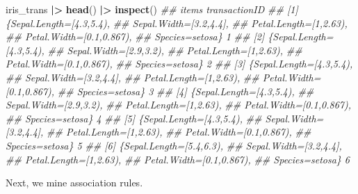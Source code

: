 \documentclass[
  notitlepage]{book}
\newenvironment{Shaded}{\begin{snugshade}}{\end{snugshade}}
\newcommand{\CommentTok}[1]{\textcolor[rgb]{0.56,0.35,0.01}{\textit{#1}}}
\newcommand{\ErrorTok}[1]{\textcolor[rgb]{0.64,0.00,0.00}{\textbf{#1}}}
\newcommand{\KeywordTok}[1]{\textcolor[rgb]{0.13,0.29,0.53}{\textbf{#1}}}
\newcommand{\NormalTok}[1]{#1}
\newcommand{\OperatorTok}[1]{\textcolor[rgb]{0.81,0.36,0.00}{\textbf{#1}}}
\newcommand{\StringTok}[1]{\textcolor[rgb]{0.31,0.60,0.02}{#1}}
\begin{document}
\begin{Shaded}
\begin{Highlighting}[]
\NormalTok{iris\_trans }\OperatorTok{|}\ErrorTok{\textgreater{}}\StringTok{ }\KeywordTok{head}\NormalTok{() }\OperatorTok{|}\ErrorTok{\textgreater{}}\StringTok{ }\KeywordTok{inspect}\NormalTok{()}
\CommentTok{\#\#     items                      transactionID}
\CommentTok{\#\# [1] \{Sepal.Length=[4.3,5.4),                }
\CommentTok{\#\#      Sepal.Width=[3.2,4.4],                 }
\CommentTok{\#\#      Petal.Length=[1,2.63),                 }
\CommentTok{\#\#      Petal.Width=[0.1,0.867),               }
\CommentTok{\#\#      Species=setosa\}                       1}
\CommentTok{\#\# [2] \{Sepal.Length=[4.3,5.4),                }
\CommentTok{\#\#      Sepal.Width=[2.9,3.2),                 }
\CommentTok{\#\#      Petal.Length=[1,2.63),                 }
\CommentTok{\#\#      Petal.Width=[0.1,0.867),               }
\CommentTok{\#\#      Species=setosa\}                       2}
\CommentTok{\#\# [3] \{Sepal.Length=[4.3,5.4),                }
\CommentTok{\#\#      Sepal.Width=[3.2,4.4],                 }
\CommentTok{\#\#      Petal.Length=[1,2.63),                 }
\CommentTok{\#\#      Petal.Width=[0.1,0.867),               }
\CommentTok{\#\#      Species=setosa\}                       3}
\CommentTok{\#\# [4] \{Sepal.Length=[4.3,5.4),                }
\CommentTok{\#\#      Sepal.Width=[2.9,3.2),                 }
\CommentTok{\#\#      Petal.Length=[1,2.63),                 }
\CommentTok{\#\#      Petal.Width=[0.1,0.867),               }
\CommentTok{\#\#      Species=setosa\}                       4}
\CommentTok{\#\# [5] \{Sepal.Length=[4.3,5.4),                }
\CommentTok{\#\#      Sepal.Width=[3.2,4.4],                 }
\CommentTok{\#\#      Petal.Length=[1,2.63),                 }
\CommentTok{\#\#      Petal.Width=[0.1,0.867),               }
\CommentTok{\#\#      Species=setosa\}                       5}
\CommentTok{\#\# [6] \{Sepal.Length=[5.4,6.3),                }
\CommentTok{\#\#      Sepal.Width=[3.2,4.4],                 }
\CommentTok{\#\#      Petal.Length=[1,2.63),                 }
\CommentTok{\#\#      Petal.Width=[0.1,0.867),               }
\CommentTok{\#\#      Species=setosa\}                       6}
\end{Highlighting}
\end{Shaded}

Next, we mine association rules.
\end{document}
